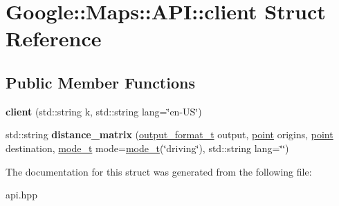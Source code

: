 \hypertarget{structGoogle_1_1Maps_1_1API_1_1client}{}\section{Google\+:\+:Maps\+:\+:A\+PI\+:\+:client Struct Reference}
\label{structGoogle_1_1Maps_1_1API_1_1client}
\subsection*{Public Member Functions}
\begin{DoxyCompactItemize}
\item 
\mbox{\label{structGoogle_1_1Maps_1_1API_1_1client_aa4e453192444e3ed3ae486036e852f03}} 
{\bfseries client} (std\+::string k, std\+::string lang=\char`\"{}en-\/US\char`\"{})
\item 
\mbox{\label{structGoogle_1_1Maps_1_1API_1_1client_a2167437cf0c3cdc7fa9e9c70643a27f4}} 
std\+::string {\bfseries distance\+\_\+matrix} (\hyperlink{structGoogle_1_1Maps_1_1API_1_1output__format__t}{output\+\_\+format\+\_\+t} output, \hyperlink{structGoogle_1_1Maps_1_1point}{point} origins, \hyperlink{structGoogle_1_1Maps_1_1point}{point} destination, \hyperlink{structGoogle_1_1Maps_1_1API_1_1mode__t}{mode\+\_\+t} mode=\hyperlink{structGoogle_1_1Maps_1_1API_1_1mode__t}{mode\+\_\+t}(\char`\"{}driving\char`\"{}), std\+::string lang=\char`\"{}\char`\"{})
\end{DoxyCompactItemize}


The documentation for this struct was generated from the following file\+:\begin{DoxyCompactItemize}
\item 
api.\+hpp\end{DoxyCompactItemize}
